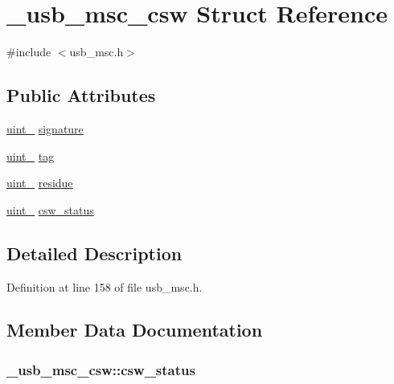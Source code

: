 \hypertarget{struct__usb__msc__csw}{}\section{\+\_\+usb\+\_\+msc\+\_\+csw Struct Reference}
\label{struct__usb__msc__csw}


{\ttfamily \#include $<$usb\+\_\+msc.\+h$>$}

\subsection*{Public Attributes}
\begin{DoxyCompactItemize}
\item 
\hyperlink{types_8h_a5532400b872b4aa84e54335bf458a318}{uint\+\_} \hyperlink{struct__usb__msc__csw_ada17b13d30a4fbe2369de6924ac6fb2f}{signature}
\item 
\hyperlink{types_8h_a5532400b872b4aa84e54335bf458a318}{uint\+\_} \hyperlink{struct__usb__msc__csw_a42b2f6bae52fb9948d573035e70fb903}{tag}
\item 
\hyperlink{types_8h_a5532400b872b4aa84e54335bf458a318}{uint\+\_} \hyperlink{struct__usb__msc__csw_a2b5c6adf9c77740bee212de92ac6434d}{residue}
\item 
\hyperlink{types_8h_ad3209046c23f739a81581c10a4be7d92}{uint\+\_} \hyperlink{struct__usb__msc__csw_afc6688c0526556fa47b4e619c3e75317}{csw\+\_\+status}
\end{DoxyCompactItemize}


\subsection{Detailed Description}


Definition at line 158 of file usb\+\_\+msc.\+h.



\subsection{Member Data Documentation}
\subsubsection[{\texorpdfstring{csw\+\_\+status}{csw_status}}]{ \+\_\+usb\+\_\+msc\+\_\+csw\+::csw\+\_\+status}\hypertarget{struct__usb__msc__csw_afc6688c0526556fa47b4e619c3e75317}{}\label{struct__usb__msc__csw_afc6688c0526556fa47b4e619c3e75317}



